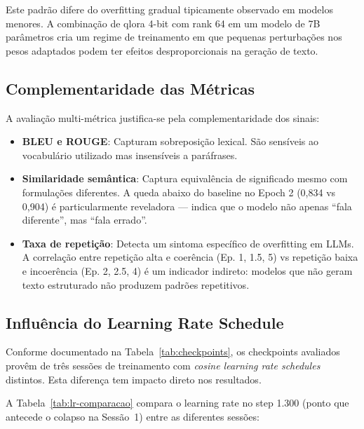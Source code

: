 Este padrão difere do overfitting gradual tipicamente observado em modelos menores. A combinação de \acrshort{qlora} 4-bit com rank 64 em um modelo de 7B parâmetros cria um regime de treinamento em que pequenas perturbações nos pesos adaptados podem ter efeitos desproporcionais na geração de texto.

\subsection{Complementaridade das Métricas}

A avaliação multi-métrica justifica-se pela complementaridade dos sinais:

\begin{itemize}
    \item \textbf{BLEU e ROUGE}: Capturam sobreposição lexical. São sensíveis ao vocabulário utilizado mas insensíveis a paráfrases.
    \item \textbf{Similaridade semântica}: Captura equivalência de significado mesmo com formulações diferentes. A queda abaixo do baseline no Epoch 2 (0,834 vs 0,904) é particularmente reveladora --- indica que o modelo não apenas ``fala diferente'', mas ``fala errado''.
    \item \textbf{Taxa de repetição}: Detecta um sintoma específico de overfitting em LLMs. A correlação entre repetição alta e coerência (Ep. 1, 1.5, 5) vs repetição baixa e incoerência (Ep. 2, 2.5, 4) é um indicador indireto: modelos que não geram texto estruturado não produzem padrões repetitivos.
\end{itemize}

\subsection{Influência do Learning Rate Schedule}
\label{subsec:influencia-lr}

Conforme documentado na Tabela~\ref{tab:checkpoints}, os checkpoints avaliados provêm de três sessões de treinamento com \textit{cosine learning rate schedules} distintos. Esta diferença tem impacto direto nos resultados.

A Tabela~\ref{tab:lr-comparacao} compara o learning rate no step 1.300 (ponto que antecede o colapso na Sessão~1) entre as diferentes sessões:

